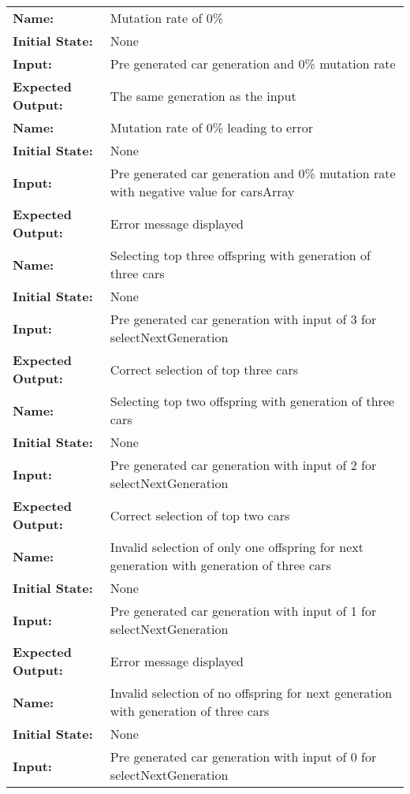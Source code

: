 \documentclass[12pt, titlepage]{article}
\begin{document}
\begin{center}
\begin{longtable}{ l | p{10cm} }
\hline
\rule{0pt}{1.5em}\textbf{Name:} & Mutation rate of 0\%\\
\textbf{Initial State:} & None\\
\textbf{Input:} & Pre generated car generation and 0\% mutation rate\\
\textbf{Expected Output:} & The same generation as the input\\[0.6em]
\hline
\rule{0pt}{1.5em}\textbf{Name:} & Mutation rate of 0\% leading to error\\
\textbf{Initial State:} & None\\
\textbf{Input:} & Pre generated car generation and 0\% mutation rate with negative value for carsArray\\
\textbf{Expected Output:} & Error message displayed\\[0.6em]
\hline
\rule{0pt}{1.5em}\textbf{Name:} & Selecting top three offspring with generation of three cars\\
\textbf{Initial State:} & None\\
\textbf{Input:} & Pre generated car generation with input of 3 for selectNextGeneration\\
\textbf{Expected Output:} & Correct selection of top three cars\\[0.6em]
\hline
\rule{0pt}{1.5em}\textbf{Name:} & Selecting top two offspring with generation of three cars\\
\textbf{Initial State:} & None\\
\textbf{Input:} & Pre generated car generation with input of 2 for selectNextGeneration\\
\textbf{Expected Output:} & Correct selection of top two cars\\[0.6em]
\hline
\rule{0pt}{1.5em}\textbf{Name:} & Invalid selection of only one offspring for next generation with generation of three cars\\
\textbf{Initial State:} & None\\
\textbf{Input:} & Pre generated car generation with input of 1 for selectNextGeneration\\
\textbf{Expected Output:} & Error message displayed\\[0.6em]
\hline
\rule{0pt}{1.5em}\textbf{Name:} & Invalid selection of no offspring for next generation with generation of three cars\\
\textbf{Initial State:} & None\\
\textbf{Input:} & Pre generated car generation with input of 0 for selectNextGeneration\\

\end{longtable}
\end{center}
\end{document}
